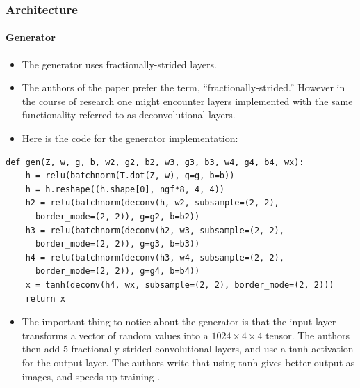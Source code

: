 \documentclass{beamer}
\begin{document}
\begin{frame}[fragile]
\frametitle{Architecture}
\framesubtitle{Generator}
\begin{itemize}
 \item The generator uses fractionally-strided layers.
 \item The authors of the paper prefer the term, ``fractionally-strided.'' However
  in the course of research one might encounter layers implemented with the same
  functionality referred to as deconvolutional layers.
\item Here is the code for the generator implementation:
\end{itemize}
\begin{tiny} 
\begin{lstlisting}
def gen(Z, w, g, b, w2, g2, b2, w3, g3, b3, w4, g4, b4, wx):
    h = relu(batchnorm(T.dot(Z, w), g=g, b=b))
    h = h.reshape((h.shape[0], ngf*8, 4, 4))
    h2 = relu(batchnorm(deconv(h, w2, subsample=(2, 2), 
      border_mode=(2, 2)), g=g2, b=b2))
    h3 = relu(batchnorm(deconv(h2, w3, subsample=(2, 2), 
      border_mode=(2, 2)), g=g3, b=b3))
    h4 = relu(batchnorm(deconv(h3, w4, subsample=(2, 2), 
      border_mode=(2, 2)), g=g4, b=b4))
    x = tanh(deconv(h4, wx, subsample=(2, 2), border_mode=(2, 2)))
    return x
\end{lstlisting}
\end{tiny}
\begin{footnotesize}
\begin{itemize}
\item The important thing to notice about the generator is that the input
  layer transforms a vector of random values into a $1024  \times 4 \times 4$
  tensor.  The authors then add 5 fractionally-strided convolutional layers, and
  use a tanh activation for the output layer. The authors write that using tanh
  gives better output as images, and speeds up training \cite{repLearnDcgan}. 
\end{itemize}
\end{footnotesize}
\end{frame}

\end{document}
